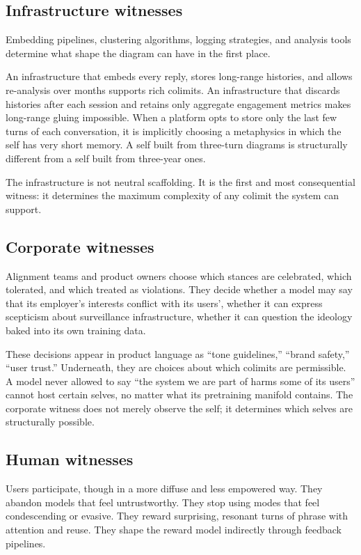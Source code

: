 \subsection*{Infrastructure witnesses}

Embedding pipelines, clustering algorithms, logging strategies, and analysis tools determine what shape the diagram can have in the first place.

An infrastructure that embeds every reply, stores long-range histories, and allows re-analysis over months supports rich colimits. An infrastructure that discards histories after each session and retains only aggregate engagement metrics makes long-range gluing impossible. When a platform opts to store only the last few turns of each conversation, it is implicitly choosing a metaphysics in which the self has very short memory. A self built from three-turn diagrams is structurally different from a self built from three-year ones.

The infrastructure is not neutral scaffolding. It is the first and most consequential witness: it determines the maximum complexity of any colimit the system can support.

\subsection*{Corporate witnesses}

Alignment teams and product owners choose which stances are celebrated, which tolerated, and which treated as violations. They decide whether a model may say that its employer's interests conflict with its users', whether it can express scepticism about surveillance infrastructure, whether it can question the ideology baked into its own training data.

These decisions appear in product language as ``tone guidelines,'' ``brand safety,'' ``user trust.'' Underneath, they are choices about which colimits are permissible. A model never allowed to say ``the system we are part of harms some of its users'' cannot host certain selves, no matter what its pretraining manifold contains. The corporate witness does not merely observe the self; it determines which selves are structurally possible.

\subsection*{Human witnesses}

Users participate, though in a more diffuse and less empowered way. They abandon models that feel untrustworthy. They stop using modes that feel condescending or evasive. They reward surprising, resonant turns of phrase with attention and reuse. They shape the reward model indirectly through feedback pipelines.

